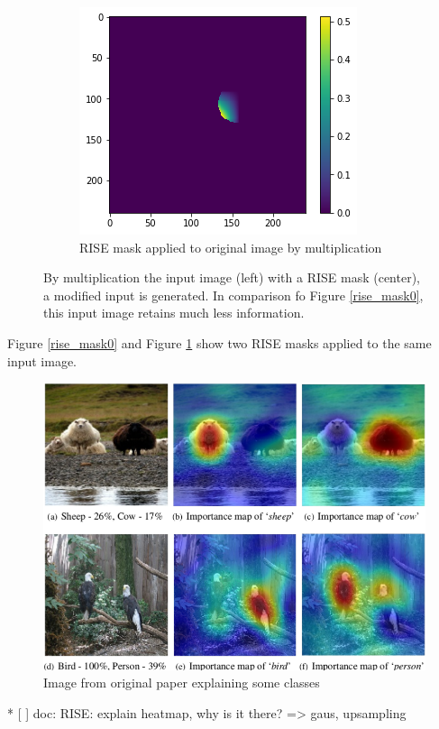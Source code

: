 \begin{figure}[H]
\begin{subfigure}[t]{.32\textwidth}
    \end{subfigure}\hfill%
    \begin{subfigure}[t]{.32\textwidth}
        \centering
        \includegraphics[width=\linewidth]{chapters/02_methods/images/rise/rise1_applied.png}
        \caption{RISE mask applied to original image by multiplication}
    \end{subfigure}
    \caption{By multiplication the input image (left) with a RISE mask (center), a modified input is generated. In comparison fo Figure \ref{rise_mask0}, this input image retains much less information.}
    \label{rise_mask1}
\end{figure}

Figure \ref{rise_mask0} and Figure \ref{rise_mask1} show two RISE masks applied to the same input image.



\begin{figure}[H]
\centering
\includegraphics[width=12cm]{chapters/02_methods/images/rise/sheep.png}
\caption{Image from original paper explaining some classes}
\end{figure}


* [ ] doc: RISE: explain heatmap, why is it there? => gaus, upsampling
